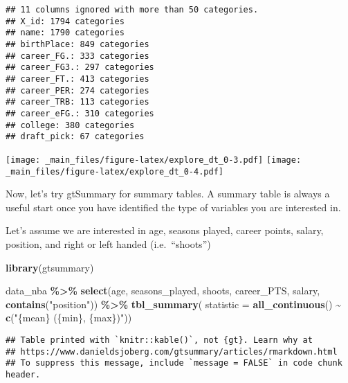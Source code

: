 \documentclass[
]{book}
\newenvironment{Shaded}{\begin{snugshade}}{\end{snugshade}}
\newcommand{\AttributeTok}[1]{\textcolor[rgb]{0.13,0.29,0.53}{#1}}
\newcommand{\FunctionTok}[1]{\textcolor[rgb]{0.13,0.29,0.53}{\textbf{#1}}}
\newcommand{\NormalTok}[1]{#1}
\newcommand{\SpecialCharTok}[1]{\textcolor[rgb]{0.81,0.36,0.00}{\textbf{#1}}}
\newcommand{\StringTok}[1]{\textcolor[rgb]{0.31,0.60,0.02}{#1}}
\begin{document}
\begin{verbatim}
## 11 columns ignored with more than 50 categories.
## X_id: 1794 categories
## name: 1790 categories
## birthPlace: 849 categories
## career_FG.: 333 categories
## career_FG3.: 297 categories
## career_FT.: 413 categories
## career_PER: 274 categories
## career_TRB: 113 categories
## career_eFG.: 310 categories
## college: 380 categories
## draft_pick: 67 categories
\end{verbatim}

\texttt{[image: \_main\_files/figure-latex/explore\_dt\_0-3.pdf]} \texttt{[image: \_main\_files/figure-latex/explore\_dt\_0-4.pdf]}

Now, let's try gtSummary for summary tables. A summary table is always a useful start once you have identified the type of variables you are interested in.

Let's assume we are interested in age, seasons played, career points, salary,
position, and right or left handed (i.e.~``shoots'')

\begin{Shaded}
\begin{Highlighting}[]
\FunctionTok{library}\NormalTok{(gtsummary)}

\NormalTok{data\_nba }\SpecialCharTok{\%\textgreater{}\%} 
  \FunctionTok{select}\NormalTok{(age, seasons\_played, shoots, career\_PTS, salary, }\FunctionTok{contains}\NormalTok{(}\StringTok{"position"}\NormalTok{)) }\SpecialCharTok{\%\textgreater{}\%}
         \FunctionTok{tbl\_summary}\NormalTok{(}
           \AttributeTok{statistic =} \FunctionTok{all\_continuous}\NormalTok{() }\SpecialCharTok{\textasciitilde{}} \FunctionTok{c}\NormalTok{(}\StringTok{"\{mean\} (\{min\}, \{max\})"}\NormalTok{)) }
\end{Highlighting}
\end{Shaded}

\begin{verbatim}
## Table printed with `knitr::kable()`, not {gt}. Learn why at
## https://www.danieldsjoberg.com/gtsummary/articles/rmarkdown.html
## To suppress this message, include `message = FALSE` in code chunk header.
\end{verbatim}
\end{document}
